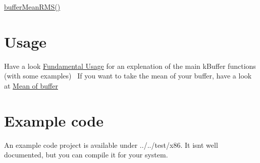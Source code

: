  \hyperlink{k_buffer_8c_a1da694b34c0a52809c923d2d149d1348}{buffer\+Mean\+R\+M\+S()}~\newline
 \hypertarget{index_usage}{}\section{Usage}\label{index_usage}
Have a look \hyperlink{fundamental_usage}{Fundamental Usage} for an explenation of the main k\+Buffer functions (with some examples)~\newline
 If you want to take the mean of your buffer, have a look at \hyperlink{mean}{Mean of buffer} \hypertarget{index_example}{}\section{Example code}\label{index_example}
An example code project is available under ../../test/x86. It isn\textquotesingle{}t well documented, but you can compile it for your system. 